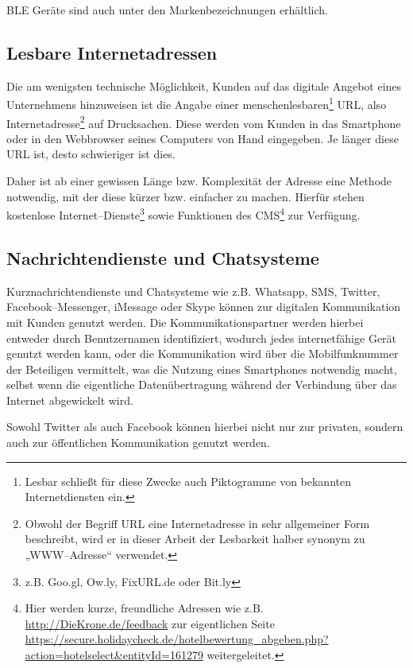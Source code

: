 BLE Geräte sind auch unter den Markenbezeichnungen  erhältlich. 

\subsection{Lesbare Internetadressen} %
\label{sub:kurzlinks}
Die am wenigsten technische Möglichkeit, Kunden auf das digitale Angebot eines Unternehmens hinzuweisen ist die Angabe einer menschenlesbaren\footnote{Lesbar schließt für diese Zwecke auch Piktogramme von bekannten Internetdiensten ein.} \ac{URL}, also Internetadresse\footnote{Obwohl der Begriff URL eine Internetadresse in sehr allgemeiner Form beschreibt, wird er in dieser Arbeit der Lesbarkeit halber synonym zu „WWW–Adresse“ verwendet.} auf Drucksachen. Diese werden vom Kunden in das Smartphone oder in den Webbrowser seines Computers von Hand eingegeben. Je länger diese URL ist, desto schwieriger ist dies.

Daher ist ab einer gewissen Länge bzw. Komplexität der Adresse eine Methode notwendig, mit der diese kürzer bzw. einfacher zu machen. Hierfür stehen kostenlose Internet–Dienste\footnote{z.B. Goo.gl, Ow.ly, FixURL.de oder Bit.ly} sowie Funktionen des \ac{CMS}\footnote{Hier werden kurze, freundliche Adressen wie z.B. \url{http://DieKrone.de/feedback} zur eigentlichen Seite \url{https://secure.holidaycheck.de/hotelbewertung_abgeben.php?action=hotelselect&entityId=161279} weitergeleitet.} zur Verfügung. 

\subsection{Nachrichtendienste und Chatsysteme} %
\label{sub:internet_nachrichtendienste}
Kurznachrichtendienste und Chatsysteme wie z.B. Whatsapp, SMS, Twitter, Facebook–Messenger, iMessage oder Skype können zur digitalen Kommunikation mit Kunden genutzt werden. Die Kommunikationspartner werden hierbei entweder durch Benutzernamen identifiziert, wodurch jedes internetfähige Gerät genutzt werden kann, oder die Kommunikation wird über die Mobilfunknummer der Beteiligen vermittelt, was die Nutzung eines Smartphones notwendig macht, selbst wenn die eigentliche Datenübertragung während der Verbindung über das Internet abgewickelt wird.

Sowohl Twitter als auch Facebook können hierbei nicht nur zur privaten, sondern auch zur öffentlichen Kommunikation genutzt werden.

